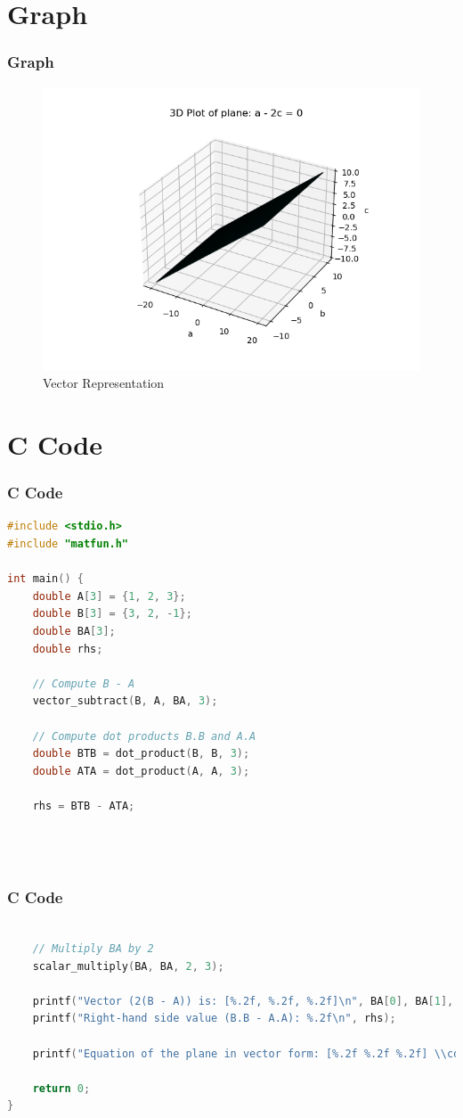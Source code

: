 \documentclass{beamer}
\numberwithin{equation}{section}
\begin{document}
\section{Graph}
\begin{frame}
    \frametitle{Graph}
    \begin{figure}[htbp]
    \centering
    \includegraphics[width=0.65\linewidth]{FIG/fig1.png}
    \caption{Vector Representation}
    \label{fig:FIG/fig1.png}
\end{figure}
\end{frame}
\section{ C Code}
\begin{frame}[fragile]
\frametitle{C Code }
\begin{lstlisting}[language=C]
#include <stdio.h>
#include "matfun.h"

int main() {
    double A[3] = {1, 2, 3};
    double B[3] = {3, 2, -1};
    double BA[3];
    double rhs;

    // Compute B - A
    vector_subtract(B, A, BA, 3);

    // Compute dot products B.B and A.A
    double BTB = dot_product(B, B, 3);
    double ATA = dot_product(A, A, 3);

    rhs = BTB - ATA;


    
\end{lstlisting}
\end{frame}
\begin{frame}[fragile]
\frametitle{C Code }
\begin{lstlisting}[language=C]

    // Multiply BA by 2
    scalar_multiply(BA, BA, 2, 3);

    printf("Vector (2(B - A)) is: [%.2f, %.2f, %.2f]\n", BA[0], BA[1], BA[2]);
    printf("Right-hand side value (B.B - A.A): %.2f\n", rhs);

    printf("Equation of the plane in vector form: [%.2f %.2f %.2f] \\cdot X = %.2f\n", BA[0], BA[1], BA[2], rhs/2);

    return 0;
}


    
\end{lstlisting}
\end{frame}
\end{document}
